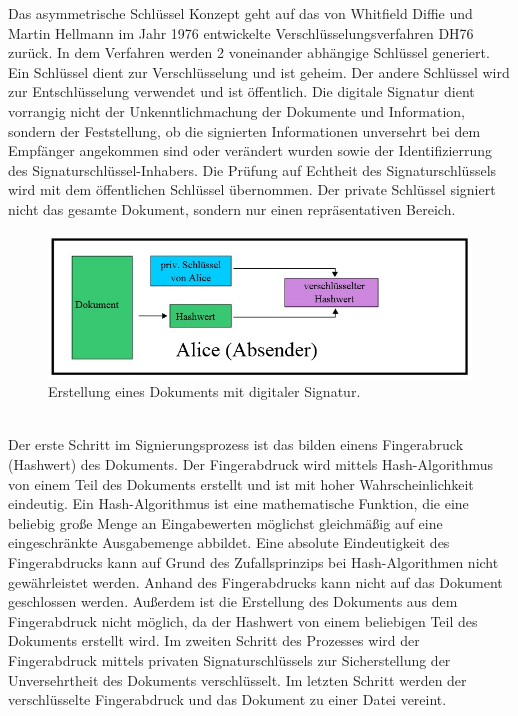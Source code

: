Das asymmetrische Schlüssel Konzept geht auf das von Whitfield Diffie und Martin Hellmann im Jahr 1976 entwickelte Verschlüsselungsverfahren DH76 zurück. In dem Verfahren werden 2 voneinander abhängige Schlüssel generiert. Ein Schlüssel dient zur Verschlüsselung und ist geheim. Der andere Schlüssel wird zur Entschlüsselung verwendet und ist öffentlich. Die digitale Signatur dient vorrangig nicht der Unkenntlichmachung der Dokumente und Information, sondern der Feststellung, ob die signierten Informationen unversehrt bei dem Empfänger angekommen sind oder verändert wurden sowie der Identifizierrung des Signaturschlüssel-Inhabers. Die Prüfung auf Echtheit des Signaturschlüssels wird mit dem öffentlichen Schlüssel übernommen. Der private Schlüssel signiert nicht das gesamte Dokument, sondern nur einen repräsentativen Bereich. \cite{techno1}
\begin{figure}[!ht]
    \centering
    \includegraphics[width=\textwidth]{ErstellungAbsender2.jpg}
    \caption[Erstellung eines Dokuments mit digitaler Signatur]{Erstellung eines Dokuments mit digitaler Signatur. \cite{techno3}}
    \label{fig:2}
\end{figure}\\
Der erste Schritt im Signierungsprozess ist das bilden einens Fingerabruck (Hashwert) des Dokuments. Der Fingerabdruck wird mittels Hash-Algorithmus von einem Teil des Dokuments erstellt und ist mit hoher Wahrscheinlichkeit eindeutig. Ein Hash-Algorithmus ist eine mathematische Funktion, die eine beliebig große Menge an Eingabewerten möglichst gleichmäßig auf eine eingeschränkte Ausgabemenge abbildet. \cite{techno2} Eine absolute Eindeutigkeit des Fingerabdrucks kann auf Grund des Zufallsprinzips bei Hash-Algorithmen nicht gewährleistet werden. Anhand des Fingerabdrucks kann nicht auf das Dokument geschlossen werden. Außerdem ist die Erstellung des Dokuments aus dem Fingerabdruck nicht möglich, da der Hashwert von einem beliebigen Teil des Dokuments erstellt wird. Im zweiten Schritt des Prozesses wird der Fingerabdruck mittels privaten Signaturschlüssels zur Sicherstellung der Unversehrtheit des Dokuments verschlüsselt. Im letzten Schritt werden der verschlüsselte Fingerabdruck und das Dokument zu einer Datei vereint. \cite{techno1}   